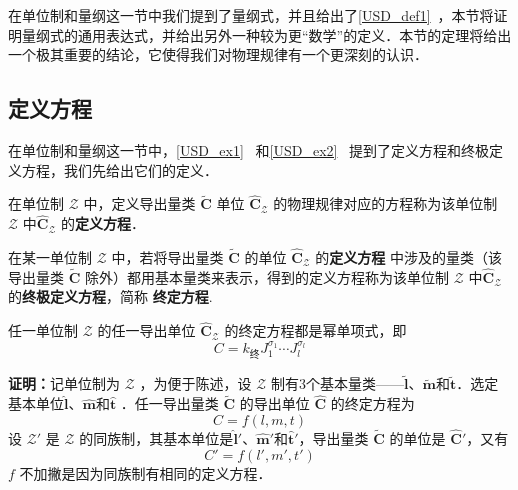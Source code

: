 
\begin{issues}
\issueTODO
\end{issues}

在单位制和量纲这一节中我们提到了量纲式，并且给出了\autoref{USD_def1}~，本节将证明量纲式的通用表达式，并给出另外一种较为更“数学”的定义．本节的定理将给出一个极其重要的结论，它使得我们对物理规律有一个更深刻的认识．
\subsection{定义方程}
在单位制和量纲这一节中，\autoref{USD_ex1}~ 和\autoref{USD_ex2}~ 提到了定义方程和终极定义方程，我们先给出它们的定义．
\begin{definition}{}
在单位制 $\mathscr{Z}$ 中，定义导出量类 $\tilde{\boldsymbol{C}}$ 单位 $\hat{\boldsymbol{C}}_{\mathscr{Z}}$ 的物理规律对应的方程称为该单位制 $\mathscr{Z}$ 中$\hat{\boldsymbol{C}}_{\mathscr{Z}}$ 的\textbf{定义方程}．
\end{definition}
\begin{definition}{}
在某一单位制 $\mathscr{Z}$ 中，若将导出量类 $\tilde{\boldsymbol{C}}$ 的单位 $\hat{\boldsymbol{C}}_{\mathscr{Z}}$ 的\textbf{定义方程} 中涉及的量类（该导出量类 $\tilde{\boldsymbol{C}}$ 除外）都用基本量类来表示，得到的定义方程称为该单位制 $\mathscr{Z}$ 中$\hat{\boldsymbol{C}}_{\mathscr{Z}}$ 的\textbf{终极定义方程}，简称 \textbf{终定方程}.
\end{definition}

\begin{theorem}{}
任一单位制 $\mathscr{Z}$ 的任一导出单位 $\hat{\boldsymbol{C}}_{ \mathscr{Z}}$ 的终定方程都是幂单项式，即
\begin{equation}
C=k_{\text{终}}J_1^{\sigma_1}\cdots J_l^{\sigma_l}
\end{equation}
\end{theorem}
\textbf{证明：}记单位制为 $\mathcal{Z}$ ，为便于陈述，设 $\mathcal{Z}$ 制有3个基本量类——$\tilde{\boldsymbol{l}}$、$\tilde{\boldsymbol{m}}$和$\tilde{\boldsymbol{t}}$．选定基本单位$\hat{\boldsymbol{l}}$、$\hat{\boldsymbol{m}}$和$\hat{\boldsymbol{t}}$ ．任一导出量类 $\tilde{\boldsymbol{C}}$ 的导出单位 $\hat{\boldsymbol{C}}$ 的终定方程为
\begin{equation}
C=f(l,m,t)
\end{equation}
设 $\mathcal{Z'}$ 是 $\mathcal{Z}$ 的同族制，其基本单位是$\hat{\boldsymbol{l}}'$、$\hat{\boldsymbol{m}}'$和$\hat{\boldsymbol{t}}'$，导出量类 $\tilde{\boldsymbol{C}}$ 的单位是  $\hat{\boldsymbol{C}}'$，又有
\begin{equation}
C'=f(l',m',t')
\end{equation}
$f$ 不加撇是因为同族制有相同的定义方程．

